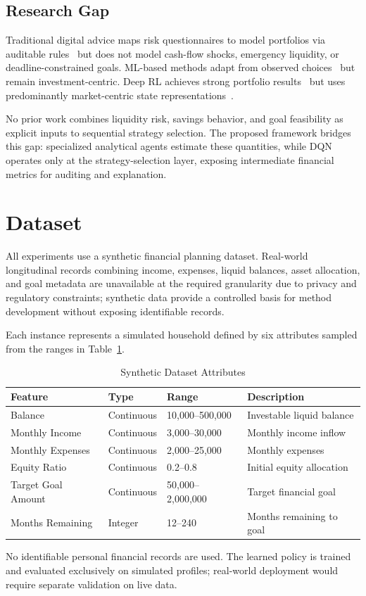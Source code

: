 \documentclass{svproc}
\begin{document}
\subsection{Research Gap}
Traditional digital advice maps risk questionnaires to model portfolios via auditable rules~\cite{alsabah2021robo,bianchi2021robo} but does not model cash-flow shocks, emergency liquidity, or deadline-constrained goals. ML-based methods adapt from observed choices~\cite{alsabah2021robo,wang2021robo} but remain investment-centric. Deep RL achieves strong portfolio results~\cite{lee2020maps,betancourt2021drl,yang2023drl,ma2023multiagent,cheng2024multiagent,li2024multiagent} but uses predominantly market-centric state representations~\cite{cong2021alpha,guan2021explainable}.

No prior work combines liquidity risk, savings behavior, and goal feasibility as explicit inputs to sequential strategy selection. The proposed framework bridges this gap: specialized analytical agents estimate these quantities, while DQN operates only at the strategy-selection layer, exposing intermediate financial metrics for auditing and explanation.

\section{Dataset}
All experiments use a synthetic financial planning dataset. Real-world longitudinal records combining income, expenses, liquid balances, asset allocation, and goal metadata are unavailable at the required granularity due to privacy and regulatory constraints; synthetic data provide a controlled basis for method development without exposing identifiable records.

Each instance represents a simulated household defined by six attributes sampled from the ranges in Table~\ref{tab:dataset}.

\begin{table}
\caption{Synthetic Dataset Attributes}
\label{tab:dataset}
\centering
\begin{tabular}{l l l p{5cm}}
\hline
Feature & Type & Range & Description \\
\hline
Balance & Continuous & 10,000--500,000 & Investable liquid balance \\
Monthly Income & Continuous & 3,000--30,000 & Monthly income inflow \\
Monthly Expenses & Continuous & 2,000--25,000 & Monthly expenses \\
Equity Ratio & Continuous & 0.2--0.8 & Initial equity allocation \\
Target Goal Amount & Continuous & 50,000--2,000,000 & Target financial goal \\
Months Remaining & Integer & 12--240 & Months remaining to goal \\
\hline
\end{tabular}
\end{table}
%
No identifiable personal financial records are used. The learned policy is trained and evaluated exclusively on simulated profiles; real-world deployment would require separate validation on live data.
\end{document}
